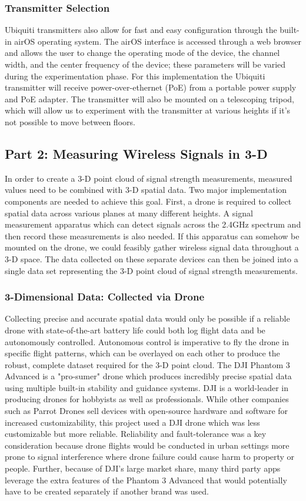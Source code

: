 \documentclass[pageno]{jpaper}
\begin{document}
\subsubsection{Transmitter Selection}

Ubiquiti transmitters also allow for fast and easy configuration through the built-in airOS operating system. The airOS interface is accessed through a web browser and allows the user to change the operating mode of the device, the channel width, and the center frequency of the device; these parameters will be varied during the experimentation phase. For this implementation the Ubiquiti transmitter will receive power-over-ethernet (PoE) from a portable power supply and PoE adapter. The transmitter will also be mounted on a telescoping tripod, which will allow us to experiment with the transmitter at various heights if it's not possible to move between floors.

\subsection{Part 2: Measuring Wireless Signals in 3-D}
In order to create a 3-D point cloud of signal strength measurements, measured values need to be combined with 3-D spatial data. Two major implementation components are needed to achieve this goal. First, a drone is required to collect spatial data across various planes at many different heights. A signal measurement apparatus which can detect signals  across the 2.4GHz spectrum and then record these measurements is also needed. If this apparatus can somehow be mounted on the drone, we could feasibly gather wireless signal data throughout a 3-D space. The data collected on these separate devices  can then be joined into a single data set representing the 3-D point cloud of signal strength measurements. 

\subsubsection{3-Dimensional Data: Collected via Drone}
Collecting precise and accurate spatial data would only be possible if a reliable  drone with state-of-the-art battery life could both log flight data and be autonomously controlled. Autonomous control is imperative to fly the drone in specific flight patterns, which can be overlayed on each other to produce the robust, complete dataset required for the 3-D point cloud. The DJI Phantom 3 Advanced is a "pro-sumer" drone which produces incredibly precise spatial data using multiple built-in stability and guidance systems. DJI is a world-leader in producing drones for hobbyists as well as professionals. While other companies such as Parrot Drones sell devices with open-source hardware and software for increased customizability, this project used a DJI drone which was less customizable but more reliable. Reliability and fault-tolerance was a key consideration because drone flights would be conducted in urban settings more prone to signal interference where drone failure could cause harm to property or people. Further, because of DJI's large market share, many third party apps leverage the extra features of the Phantom 3 Advanced that would potentially have to be created separately if another brand was used. 
\end{document}
